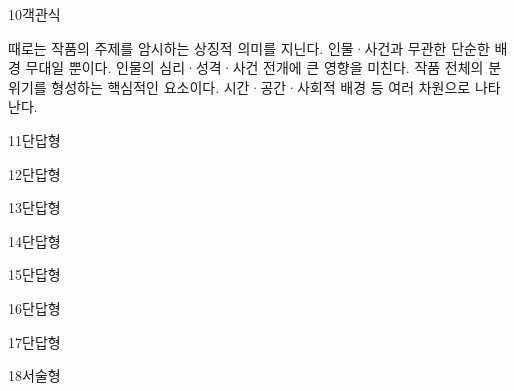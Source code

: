 \documentclass[fs85,seriesRus]{korfarm-base}
\begin{document}
\begin{kfQBlock}{10}{객관식}
\begin{kfChoices}
\kfChoice 때로는 작품의 주제를 암시하는 상징적 의미를 지닌다.
\kfChoice 인물·사건과 무관한 단순한 배경 무대일 뿐이다.
\kfChoice 인물의 심리·성격·사건 전개에 큰 영향을 미친다.
\kfChoice 작품 전체의 분위기를 형성하는 핵심적인 요소이다.
\kfChoice 시간·공간·사회적 배경 등 여러 차원으로 나타난다.
\end{kfChoices}
\end{kfQBlock}
\begin{kfQBlock}{11}{단답형}
\end{kfQBlock}
\begin{kfQBlock}{12}{단답형}
\end{kfQBlock}
\begin{kfQBlock}{13}{단답형}
\end{kfQBlock}
\begin{kfQBlock}{14}{단답형}
\end{kfQBlock}
\begin{kfQBlock}{15}{단답형}
\end{kfQBlock}
\begin{kfQBlock}{16}{단답형}
\end{kfQBlock}
\begin{kfQBlock}{17}{단답형}
\end{kfQBlock}
\begin{kfQBlock}{18}{서술형}
\end{kfQBlock}
\kfEndMC


\end{document}
